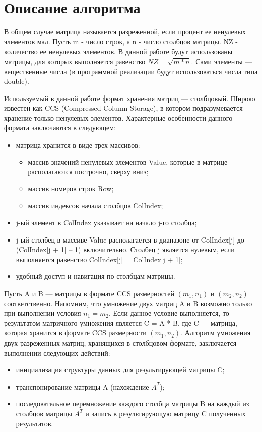 \documentclass{report}
\begin{document}
\section*{Описание алгоритма}
\par В общем случае матрица называется разреженной, если  процент ее ненулевых элементов мал. Пусть m - число строк, а n - число столбцов матрицы. NZ - количество ее ненулевых элементов. В данной работе будут использованы матрицы, для которых выполняется равенство $NZ = \sqrt{m*n}$. Сами элементы — вещественные числа (в программной реализации будут использоваться числа типа double).
\par Используемый в данной работе формат хранения матриц — столбцовый. Широко известен как CCS (Compressed Column Storage), в котором подразумевается хранение только ненулевых элементов. Характерные особенности данного формата заключаются в следующем:
\begin{itemize}
	\item матрица хранится в виде трех массивов:
	\begin{itemize}
		\item массив значений ненулевых элементов Value, которые в матрице располагаются построчно, сверху вниз;
		\item массив номеров строк Row;
		\item массив индексов начала столбцов ColIndex;
	\end{itemize}
	\item j-ый элемент в ColIndex указывает на начало j-го столбца;
	\item j-ый столбец в массиве Value располагается в диапазоне от ColIndex[j] до (ColIndex[j + 1] – 1) включительно. Столбец j является нулевым, если выполняется равенство ColIndex[j] = ColIndex[j + 1];
	\item удобный доступ и навигация по столбцам матрицы.
\end{itemize}
\par Пусть A и B — матрицы в формате CCS размерностей $(m_{1}, n_{1})$ и $(m_{2}, n_{2})$ соответственно. Напомним, что умножение двух матриц A и B возможно только при выполнении условия $n_{1} = m_{2}$. Если данное условие выполняется, то результатом матричного умножения является C = A * B, где C — матрица, которая хранится в формате CCS размерности $(m_{1}, n_{2})$. Алгоритм умножения двух разреженных матриц, хранящихся в столбцовом формате, заключается выполнении следующих действий:
\begin{itemize}
	\item инициализация структуры данных для результирующей матрицы C;
	\item транспонирование матрицы A (нахождение $A^{T}$);
	\item последовательное перемножение каждого столбца матрицы B на каждый из столбцов матрицы $A^{T}$ и запись в результирующую матрицу C полученных результатов.
\end{itemize}
\newpage
\end{document}
